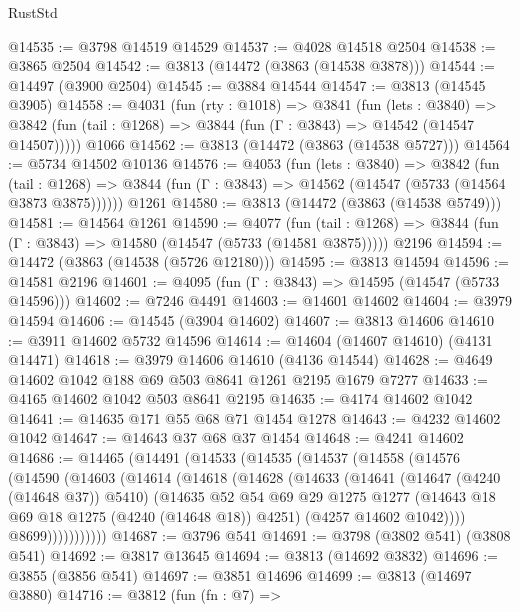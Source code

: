 \begin{lexlean}{RustStd}
\begin{coremodule}
{\begin{coremodule}
{{{{{{{{{{{{{{{{{{{{{{{{{{{{{{{{{{{@14535 := @3798 @14519 @14529
@14537 := @4028 @14518 @2504
@14538 := @3865 @2504
@14542 := @3813 (@14472 (@3863 (@14538 @3878)))
@14544 := @14497 (@3900 @2504)
@14545 := @3884 @14544
@14547 := @3813 (@14545 @3905)
@14558 := @4031
    (fun (rty : @1018) =>
    @3841
      (fun (lets : @3840) =>
      @3842 (fun (tail : @1268) => @3844 (fun (Γ : @3843) => @14542 (@14547 @14507)))))
    @1066
@14562 := @3813 (@14472 (@3863 (@14538 @5727)))
@14564 := @5734 @14502 @10136
@14576 := @4053
    (fun (lets : @3840) =>
    @3842
      (fun (tail : @1268) =>
      @3844 (fun (Γ : @3843) => @14562 (@14547 (@5733 (@14564 @3873 @3875))))))
    @1261
@14580 := @3813 (@14472 (@3863 (@14538 @5749)))
@14581 := @14564 @1261
@14590 := @4077
    (fun (tail : @1268) => @3844 (fun (Γ : @3843) => @14580 (@14547 (@5733 (@14581 @3875)))))
    @2196
@14594 := @14472 (@3863 (@14538 (@5726 @12180)))
@14595 := @3813 @14594
@14596 := @14581 @2196
@14601 := @4095 (fun (Γ : @3843) => @14595 (@14547 (@5733 @14596)))
@14602 := @7246 @4491
@14603 := @14601 @14602
@14604 := @3979 @14594
@14606 := @14545 (@3904 @14602)
@14607 := @3813 @14606
@14610 := @3911 @14602 @5732 @14596
@14614 := @14604 (@14607 @14610) (@4131 @14471)
@14618 := @3979 @14606 @14610 (@4136 @14544)
@14628 := @4649 @14602 @1042 @188 @69 @503 @8641 @1261 @2195 @1679 @7277
@14633 := @4165 @14602 @1042 @503 @8641 @2195
@14635 := @4174 @14602 @1042
@14641 := @14635 @171 @55 @68 @71 @1454 @1278
@14643 := @4232 @14602 @1042
@14647 := @14643 @37 @68 @37 @1454
@14648 := @4241 @14602
@14686 := @14465
    (@14491
      (@14533
        (@14535
          (@14537
            (@14558
              (@14576
                (@14590
                  (@14603
                    (@14614
                      (@14618
                        (@14628
                          (@14633
                            (@14641
                              (@14647 (@4240 (@14648 @37)) @5410)
                              (@14635
                                @52
                                @54
                                @69
                                @29
                                @1275
                                @1277
                                (@14643 @18 @69 @18 @1275 (@4240 (@14648 @18)) @4251)
                                (@4257 @14602 @1042))))
                          @8699)))))))))))
@14687 := @3796 @541
@14691 := @3798 (@3802 @541) (@3808 @541)
@14692 := @3817 @13645
@14694 := @3813 (@14692 @3832)
@14696 := @3855 (@3856 @541)
@14697 := @3851 @14696
@14699 := @3813 (@14697 @3880)
@14716 := @3812
    (fun (fn : @7) =>
}}}}}}}}}}}}}}}}}}}}}}}}}}}}}}}}}}}
\end{coremodule}}
\end{coremodule}
\end{lexlean}
